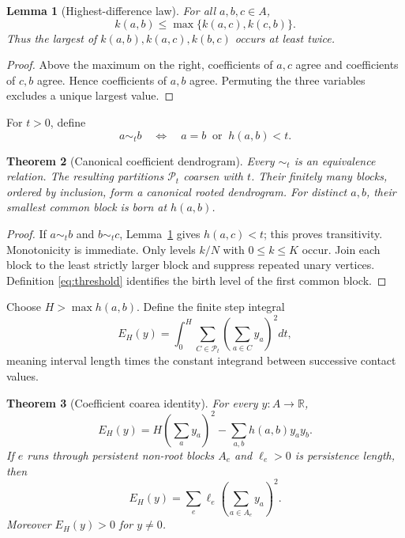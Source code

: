 \documentclass[11pt,a4paper]{amsart}
\theoremstyle{plain}
\newtheorem{theorem}{Theorem}[section]
\newtheorem{lemma}[theorem]{Lemma}
\theoremstyle{definition}
\newcommand{\RR}{\mathbb R}
\newcommand{\Pcal}{\mathcal P}
\begin{document}
\begin{lemma}[Highest-difference law]\label{lem:three-point}
For all $a,b,c\in A$,
\begin{equation}\label{eq:three-point}
                         k(a,b)\leq\max\{k(a,c),k(c,b)\}.
\end{equation}
Thus the largest of $k(a,b),k(a,c),k(b,c)$ occurs at least twice.
\end{lemma}

\begin{proof}
Above the maximum on the right, coefficients of $a,c$ agree and coefficients of $c,b$ agree.
Hence coefficients of $a,b$ agree.  Permuting the three variables excludes a unique largest value.
\end{proof}

For $t>0$, define
\begin{equation}\label{eq:threshold}
              a\sim_t b\quad\Longleftrightarrow\quad a=b\ \text{ or }\ h(a,b)<t.
\end{equation}

\begin{theorem}[Canonical coefficient dendrogram]\label{thm:dendrogram}
Every $\sim_t$ is an equivalence relation.  The resulting partitions $\Pcal_t$ coarsen with $t$.
Their finitely many blocks, ordered by inclusion, form a canonical rooted dendrogram.  For
distinct $a,b$, their smallest common block is born at $h(a,b)$.
\end{theorem}

\begin{proof}
If $a\sim_t b$ and $b\sim_t c$, Lemma~\ref{lem:three-point} gives $h(a,c)<t$; this proves
transitivity.  Monotonicity is immediate.  Only levels $k/N$ with $0\leq k\leq K$ occur.  Join
each block to the least strictly larger block and suppress repeated unary vertices.  Definition
\eqref{eq:threshold} identifies the birth level of the first common block.
\end{proof}

Choose $H>\max h(a,b)$.  Define the finite step integral
\begin{equation}\label{eq:partition-energy}
 E_H(y)=\int_0^H\sum_{C\in\Pcal_t}\left(\sum_{a\in C}y_a\right)^2dt,
\end{equation}
meaning interval length times the constant integrand between successive contact values.

\begin{theorem}[Coefficient coarea identity]\label{thm:coarea}
For every $y:A\to\RR$,
\begin{equation}\label{eq:coarea}
 E_H(y)=H\left(\sum_ay_a\right)^2-\sum_{a,b}h(a,b)y_ay_b.
\end{equation}
If $e$ runs through persistent non-root blocks $A_e$ and $\ell_e>0$ is persistence length, then
\begin{equation}\label{eq:cut-energy}
                         E_H(y)=\sum_e\ell_e\left(\sum_{a\in A_e}y_a\right)^2.
\end{equation}
Moreover $E_H(y)>0$ for $y\ne0$.
\end{theorem}
\end{document}
